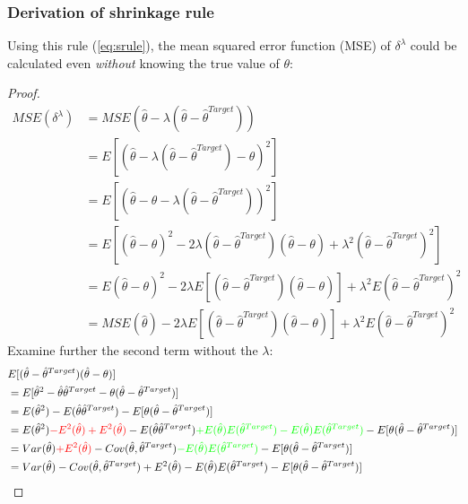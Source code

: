 \subsubsection{Derivation of shrinkage rule}
Using this rule (\autoref{eq:srule}), the mean squared error function (MSE) of $\delta^{\lambda}$ could be calculated even {\it without} knowing the true value of {\bf $\theta$}:
\begin{proof}
\begin{align*}
	MSE(\delta^{\lambda}) 	& = MSE(\hat \theta - \lambda(\hat \theta - {\hat \theta}^{Target})) \\							
							& = E[(\hat \theta - \lambda(\hat \theta - {\hat \theta}^{Target}) - \theta)^2] \\ 
							& = E[(\hat \theta  - \theta - \lambda(\hat \theta - {\hat \theta}^{Target}))^2] \\
							& = E[ (\hat \theta  - \theta)^2 - 2\lambda(\hat \theta - {\hat \theta}^{Target})(\hat \theta - \theta) + \lambda^2(\hat \theta - {\hat \theta}^{Target})^2 ]  \\
							& = E(\hat \theta  - \theta)^2 - 2\lambda E[(\hat \theta - {\hat \theta}^{Target})(\hat \theta - \theta)] + \lambda^2 E(\hat \theta - {\hat \theta}^{Target})^2 \\
							& = MSE(\hat \theta) - 2\lambda E[(\hat \theta - {\hat \theta}^{Target})(\hat \theta - \theta)] + \lambda^2 E(\hat \theta - {\hat \theta}^{Target})^2
\end{align*}
Examine further the second term without the $\lambda$:
\begin{align*}
	& E[(\hat \theta - {\hat \theta}^{Target})(\hat \theta - \theta)] \\
	& = E[ \hat \theta^2 - \hat \theta{\hat \theta}^{Target} - \theta(\hat \theta - \hat \theta^{Target}) ] \\
	& = E(\hat \theta^2) - E(\hat \theta{\hat \theta}^{Target}) - E[ \theta(\hat \theta - \hat \theta^{Target}) ] \\
	& = E(\hat \theta^2) {\color{red} - E^2(\hat \theta) + E^2(\hat \theta)} - E(\hat \theta{\hat \theta}^{Target}) {\color{green} + E(\hat \theta)E(\hat \theta^{Target}) - E(\hat \theta)E(\hat \theta^{Target})} - E[ \theta(\hat \theta - \hat \theta^{Target}) ] \\
	& = Var(\hat \theta) {\color{red} + E^2(\hat \theta)} - Cov(\hat \theta, \hat \theta^{Target}) {\color{green} - E(\hat \theta)E(\hat \theta^{Target})} - E[ \theta(\hat \theta - \hat \theta^{Target}) ]\\
	& = Var(\hat \theta) - Cov(\hat \theta, \hat \theta^{Target}) + E^2(\hat \theta) - E(\hat \theta)E(\hat \theta^{Target}) - E[ \theta(\hat \theta - \hat \theta^{Target}) ]\\

\end{align*}
\end{proof}
